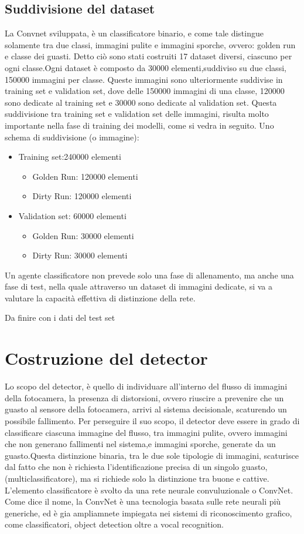 \documentclass[14pt]{extarticle}
\begin{document}
\subsection{Suddivisione del dataset}
La Convnet sviluppata, è un classificatore binario, e come tale distingue solamente tra due classi, immagini pulite e immagini sporche, ovvero: golden run e classe dei guasti.
Detto ciò sono stati costruiti 17 dataset diversi, ciascuno per ogni classe.Ogni dataset è composto da 30000 elementi,suddiviso su due classi, 150000 immagini per classe. Queste immagini sono ulteriormente suddivise in training set e validation set, dove delle 150000 immagini di una classe, 120000 sono dedicate al training set e 30000 sono dedicate al validation set.
Questa suddivisione tra training set e validation set delle immagini, risulta molto importante nella fase di training dei modelli, come si vedra in seguito.
Uno schema di suddivisione (o immagine):
\begin{itemize}
\item Training set:240000 elementi
\begin{itemize}
\item Golden Run: 120000 elementi
\item Dirty Run: 120000 elementi
\end{itemize}
\item Validation set: 60000 elementi
\begin{itemize}
\item Golden Run: 30000 elementi
\item Dirty Run: 30000 elementi
\end{itemize}
\end{itemize}
Un agente classificatore non prevede solo una fase di allenamento, ma anche una fase di test, nella quale attraverso un dataset di immagini dedicate, si va a valutare la capacità effettiva di distinzione della rete.

Da finire con i dati del test set
\section{Costruzione del detector}
Lo scopo del detector, è quello di individuare all'interno del flusso di immagini della fotocamera, la presenza di distorsioni, ovvero riuscire a prevenire che un guasto al sensore della fotocamera, arrivi al sistema decisionale, scaturendo un possibile fallimento. Per perseguire il suo scopo, il detector deve essere in grado di classificare ciascuna immagine del flusso, tra immagini pulite, ovvero immagini che non generano fallimenti nel sistema,e immagini sporche, generate da un guasto.Questa distinzione binaria, tra le due sole tipologie di immagini, scaturisce dal fatto che non è richiesta l'identificazione precisa di un singolo guasto,(multiclassificatore), ma si richiede solo la distinzione tra buone e cattive.
L'elemento classificatore è svolto da una rete neurale convuluzionale o ConvNet.
Come dice il nome, la  ConvNet è  una tecnologia basata sulle rete neurali più generiche, ed è gia ampliamnete impiegata nei sistemi di riconoscimento grafico, come classificatori, object detection oltre a vocal recognition.
\end{document}
